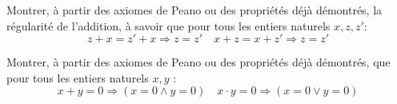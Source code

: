 \documentclass[french]{report}
\begin{document}
\begin{exo}
    Montrer, à partir des axiomes de Peano ou des propriétés déjà démontrés, la
    régularité de l'addition, à savoir que pour tous les entiers naturels \(x,z,z'\):
    \[z+x=z'+x\Rightarrow z=z'\quad x+z=x+z'\Rightarrow z=z'\]
\end{exo}

\begin{exo}
    Montrer, à partir des axiomes de Peano ou des propriétés déjà démontrés,
    que pour tous les entiers naturels \(x,y\) :
    \[x+y=0\Rightarrow\left(x=0\land y=0\right)\quad x\cdot
    y=0\Rightarrow\left(x=0\lor y=0\right)\]
\end{exo}
\end{document}
